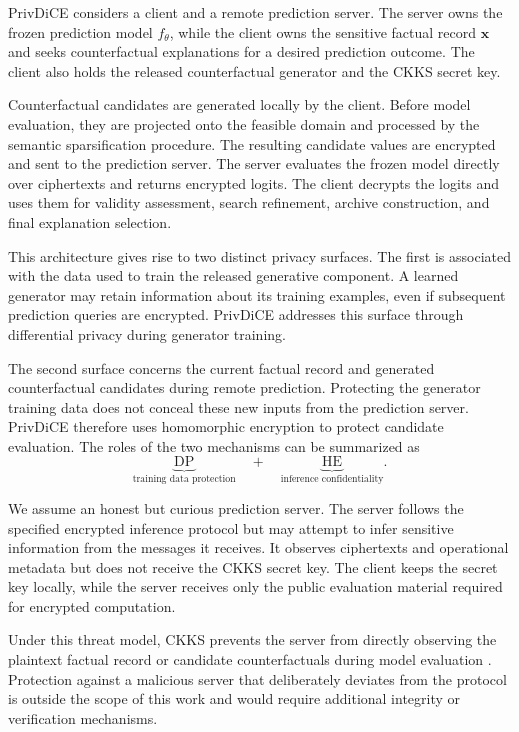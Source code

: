 \documentclass[preprint,12pt]{elsarticle}
\begin{document}
PrivDiCE considers a client and a remote prediction server. The server owns the
frozen prediction model $f_{\theta}$, while the client owns the sensitive
factual record $\mathbf{x}$ and seeks counterfactual explanations for a desired
prediction outcome. The client also holds the released counterfactual generator
and the CKKS secret key.

Counterfactual candidates are generated locally by the client. Before model
evaluation, they are projected onto the feasible domain and processed by the
semantic sparsification procedure. The resulting candidate values are encrypted
and sent to the prediction server. The server evaluates the frozen model
directly over ciphertexts and returns encrypted logits. The client decrypts the
logits and uses them for validity assessment, search refinement, archive
construction, and final explanation selection.

This architecture gives rise to two distinct privacy surfaces. The first is
associated with the data used to train the released generative component. A
learned generator may retain information about its training examples, even if
subsequent prediction queries are encrypted. PrivDiCE addresses this surface
through differential privacy during generator training.

The second surface concerns the current factual record and generated
counterfactual candidates during remote prediction. Protecting the generator
training data does not conceal these new inputs from the prediction server.
PrivDiCE therefore uses homomorphic encryption to protect candidate evaluation.
The roles of the two mechanisms can be summarized as
\begin{equation}
\underbrace{\mathrm{DP}}_{\text{training data protection}}
\quad+\quad
\underbrace{\mathrm{HE}}_{\text{inference confidentiality}}.
\label{eq:privacy_surfaces}
\end{equation}

We assume an honest but curious prediction server. The server follows the
specified encrypted inference protocol but may attempt to infer sensitive
information from the messages it receives. It observes ciphertexts and
operational metadata but does not receive the CKKS secret key. The client keeps
the secret key locally, while the server receives only the public evaluation
material required for encrypted computation.

Under this threat model, CKKS prevents the server from directly observing the
plaintext factual record or candidate counterfactuals during model evaluation
\cite{cheon2017homomorphic}. Protection against a malicious server that
deliberately deviates from the protocol is outside the scope of this work and
would require additional integrity or verification mechanisms.
\end{document}
